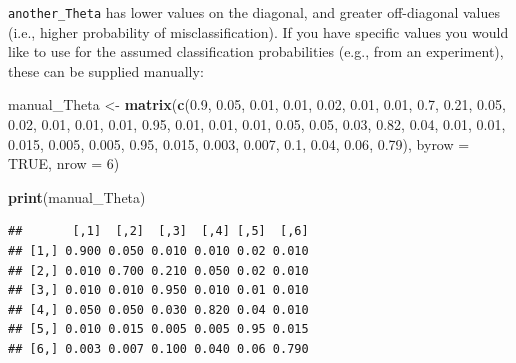 \documentclass[
]{article}
\newenvironment{Shaded}{\begin{snugshade}}{\end{snugshade}}
\newcommand{\AttributeTok}[1]{\textcolor[rgb]{0.13,0.29,0.53}{#1}}
\newcommand{\ConstantTok}[1]{\textcolor[rgb]{0.56,0.35,0.01}{#1}}
\newcommand{\DecValTok}[1]{\textcolor[rgb]{0.00,0.00,0.81}{#1}}
\newcommand{\FloatTok}[1]{\textcolor[rgb]{0.00,0.00,0.81}{#1}}
\newcommand{\FunctionTok}[1]{\textcolor[rgb]{0.13,0.29,0.53}{\textbf{#1}}}
\newcommand{\NormalTok}[1]{#1}
\newcommand{\OtherTok}[1]{\textcolor[rgb]{0.56,0.35,0.01}{#1}}
\begin{document}
\linespread{1}

\texttt{another\_Theta} has lower values on the diagonal, and greater off-diagonal values (i.e., higher probability of misclassification). If you have specific values you would like to use for the assumed classification probabilities (e.g., from an experiment), these can be supplied manually:

\linespread{1}

\begin{Shaded}
\begin{Highlighting}[]
\NormalTok{manual\_Theta }\OtherTok{\textless{}{-}} \FunctionTok{matrix}\NormalTok{(}\FunctionTok{c}\NormalTok{(}\FloatTok{0.9}\NormalTok{, }\FloatTok{0.05}\NormalTok{, }\FloatTok{0.01}\NormalTok{, }\FloatTok{0.01}\NormalTok{, }\FloatTok{0.02}\NormalTok{, }\FloatTok{0.01}\NormalTok{, }
                       \FloatTok{0.01}\NormalTok{, }\FloatTok{0.7}\NormalTok{, }\FloatTok{0.21}\NormalTok{, }\FloatTok{0.05}\NormalTok{, }\FloatTok{0.02}\NormalTok{, }\FloatTok{0.01}\NormalTok{,  }
                       \FloatTok{0.01}\NormalTok{, }\FloatTok{0.01}\NormalTok{, }\FloatTok{0.95}\NormalTok{, }\FloatTok{0.01}\NormalTok{, }\FloatTok{0.01}\NormalTok{, }\FloatTok{0.01}\NormalTok{,}
                       \FloatTok{0.05}\NormalTok{, }\FloatTok{0.05}\NormalTok{, }\FloatTok{0.03}\NormalTok{, }\FloatTok{0.82}\NormalTok{, }\FloatTok{0.04}\NormalTok{, }\FloatTok{0.01}\NormalTok{,}
                       \FloatTok{0.01}\NormalTok{, }\FloatTok{0.015}\NormalTok{,  }\FloatTok{0.005}\NormalTok{,  }\FloatTok{0.005}\NormalTok{, }\FloatTok{0.95}\NormalTok{, }\FloatTok{0.015}\NormalTok{,}
                       \FloatTok{0.003}\NormalTok{, }\FloatTok{0.007}\NormalTok{, }\FloatTok{0.1}\NormalTok{, }\FloatTok{0.04}\NormalTok{, }\FloatTok{0.06}\NormalTok{, }\FloatTok{0.79}\NormalTok{), }
                       \AttributeTok{byrow =} \ConstantTok{TRUE}\NormalTok{, }\AttributeTok{nrow =} \DecValTok{6}\NormalTok{)}

\FunctionTok{print}\NormalTok{(manual\_Theta)}
\end{Highlighting}
\end{Shaded}

\begin{verbatim}
##       [,1]  [,2]  [,3]  [,4] [,5]  [,6]
## [1,] 0.900 0.050 0.010 0.010 0.02 0.010
## [2,] 0.010 0.700 0.210 0.050 0.02 0.010
## [3,] 0.010 0.010 0.950 0.010 0.01 0.010
## [4,] 0.050 0.050 0.030 0.820 0.04 0.010
## [5,] 0.010 0.015 0.005 0.005 0.95 0.015
## [6,] 0.003 0.007 0.100 0.040 0.06 0.790
\end{verbatim}
\end{document}
